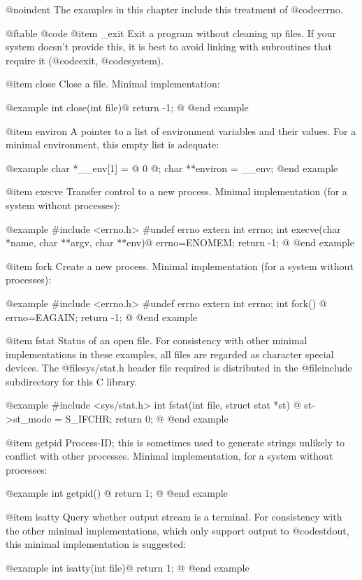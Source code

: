 @noindent
The examples in this chapter include this treatment of @code{errno}.

@ftable @code
@item _exit
Exit a program without cleaning up files.  If your system doesn't
provide this, it is best to avoid linking with subroutines that require
it (@code{exit}, @code{system}).

@item close
Close a file.  Minimal implementation:

@example
int close(int file)@{
    return -1;
@}
@end example

@item environ
A pointer to a list of environment variables and their values.  For a
minimal environment, this empty list is adequate:

@example
char *__env[1] = @{ 0 @};
char **environ = __env;
@end example

@item execve
Transfer control to a new process.  Minimal implementation (for a system
without processes):

@example
#include <errno.h>
#undef errno
extern int errno;
int execve(char *name, char **argv, char **env)@{
  errno=ENOMEM;
  return -1;
@}
@end example

@item fork
Create a new process.  Minimal implementation (for a system without processes):

@example
#include <errno.h>
#undef errno
extern int errno;
int fork() @{
  errno=EAGAIN;
  return -1;
@}
@end example

@item fstat
Status of an open file.  For consistency with other minimal
implementations in these examples, all files are regarded as character
special devices.  The @file{sys/stat.h} header file required is
distributed in the @file{include} subdirectory for this C library.

@example
#include <sys/stat.h>
int fstat(int file, struct stat *st) @{
  st->st_mode = S_IFCHR;
  return 0;
@}
@end example

@item getpid
Process-ID; this is sometimes used to generate strings unlikely to
conflict with other processes.  Minimal implementation, for a system
without processes:

@example
int getpid() @{
  return 1;
@}
@end example

@item isatty
Query whether output stream is a terminal.   For consistency with the
other minimal implementations, which only support output to
@code{stdout}, this minimal implementation is suggested:

@example
int isatty(int file)@{
   return 1;
@}
@end example

